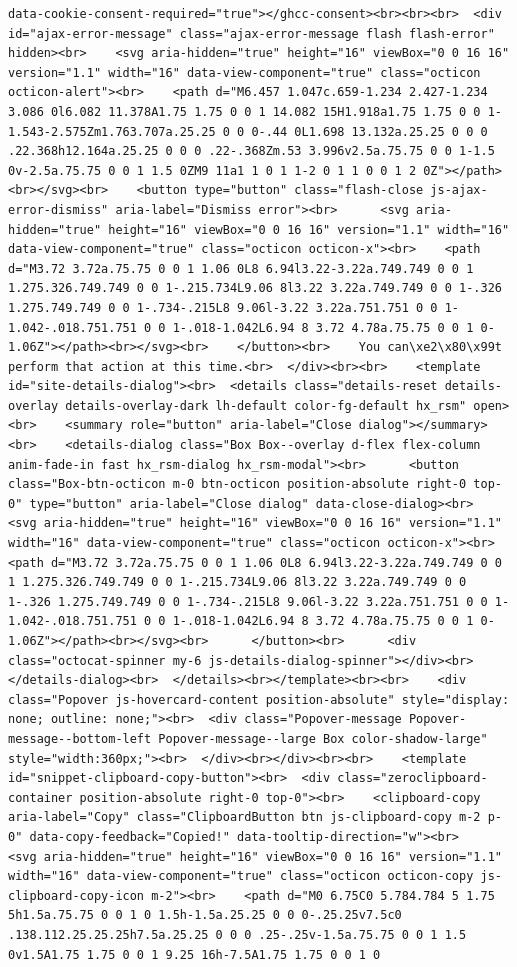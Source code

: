 \documentclass[
  letterpaper,
]{book}
\begin{document}
\begin{verbatim}
data-cookie-consent-required="true"></ghcc-consent><br><br><br>  <div id="ajax-error-message" class="ajax-error-message flash flash-error" hidden><br>    <svg aria-hidden="true" height="16" viewBox="0 0 16 16" version="1.1" width="16" data-view-component="true" class="octicon octicon-alert"><br>    <path d="M6.457 1.047c.659-1.234 2.427-1.234 3.086 0l6.082 11.378A1.75 1.75 0 0 1 14.082 15H1.918a1.75 1.75 0 0 1-1.543-2.575Zm1.763.707a.25.25 0 0 0-.44 0L1.698 13.132a.25.25 0 0 0 .22.368h12.164a.25.25 0 0 0 .22-.368Zm.53 3.996v2.5a.75.75 0 0 1-1.5 0v-2.5a.75.75 0 0 1 1.5 0ZM9 11a1 1 0 1 1-2 0 1 1 0 0 1 2 0Z"></path><br></svg><br>    <button type="button" class="flash-close js-ajax-error-dismiss" aria-label="Dismiss error"><br>      <svg aria-hidden="true" height="16" viewBox="0 0 16 16" version="1.1" width="16" data-view-component="true" class="octicon octicon-x"><br>    <path d="M3.72 3.72a.75.75 0 0 1 1.06 0L8 6.94l3.22-3.22a.749.749 0 0 1 1.275.326.749.749 0 0 1-.215.734L9.06 8l3.22 3.22a.749.749 0 0 1-.326 1.275.749.749 0 0 1-.734-.215L8 9.06l-3.22 3.22a.751.751 0 0 1-1.042-.018.751.751 0 0 1-.018-1.042L6.94 8 3.72 4.78a.75.75 0 0 1 0-1.06Z"></path><br></svg><br>    </button><br>    You can\xe2\x80\x99t perform that action at this time.<br>  </div><br><br>    <template id="site-details-dialog"><br>  <details class="details-reset details-overlay details-overlay-dark lh-default color-fg-default hx_rsm" open><br>    <summary role="button" aria-label="Close dialog"></summary><br>    <details-dialog class="Box Box--overlay d-flex flex-column anim-fade-in fast hx_rsm-dialog hx_rsm-modal"><br>      <button class="Box-btn-octicon m-0 btn-octicon position-absolute right-0 top-0" type="button" aria-label="Close dialog" data-close-dialog><br>        <svg aria-hidden="true" height="16" viewBox="0 0 16 16" version="1.1" width="16" data-view-component="true" class="octicon octicon-x"><br>    <path d="M3.72 3.72a.75.75 0 0 1 1.06 0L8 6.94l3.22-3.22a.749.749 0 0 1 1.275.326.749.749 0 0 1-.215.734L9.06 8l3.22 3.22a.749.749 0 0 1-.326 1.275.749.749 0 0 1-.734-.215L8 9.06l-3.22 3.22a.751.751 0 0 1-1.042-.018.751.751 0 0 1-.018-1.042L6.94 8 3.72 4.78a.75.75 0 0 1 0-1.06Z"></path><br></svg><br>      </button><br>      <div class="octocat-spinner my-6 js-details-dialog-spinner"></div><br>    </details-dialog><br>  </details><br></template><br><br>    <div class="Popover js-hovercard-content position-absolute" style="display: none; outline: none;"><br>  <div class="Popover-message Popover-message--bottom-left Popover-message--large Box color-shadow-large" style="width:360px;"><br>  </div><br></div><br><br>    <template id="snippet-clipboard-copy-button"><br>  <div class="zeroclipboard-container position-absolute right-0 top-0"><br>    <clipboard-copy aria-label="Copy" class="ClipboardButton btn js-clipboard-copy m-2 p-0" data-copy-feedback="Copied!" data-tooltip-direction="w"><br>      <svg aria-hidden="true" height="16" viewBox="0 0 16 16" version="1.1" width="16" data-view-component="true" class="octicon octicon-copy js-clipboard-copy-icon m-2"><br>    <path d="M0 6.75C0 5.784.784 5 1.75 5h1.5a.75.75 0 0 1 0 1.5h-1.5a.25.25 0 0 0-.25.25v7.5c0 .138.112.25.25.25h7.5a.25.25 0 0 0 .25-.25v-1.5a.75.75 0 0 1 1.5 0v1.5A1.75 1.75 0 0 1 9.25 16h-7.5A1.75 1.75 0 0 1 0 
\end{verbatim}
\end{document}
